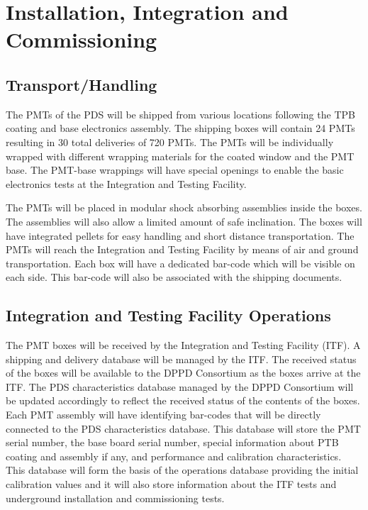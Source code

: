 \section{Installation, Integration and Commissioning}
\label{sec:fddp-pd-9}

\subsection{Transport/Handling}
\label{sec:fddp-pd-9.1}

The PMTs of the PDS will be shipped from various locations following the TPB coating and base electronics assembly. The shipping boxes will contain 24 PMTs resulting in 30 total deliveries of 720 PMTs. The PMTs will be individually wrapped with different wrapping materials for the coated window and the PMT base. The PMT-base wrappings will have special openings to enable the basic electronics tests at the Integration and Testing Facility.

The PMTs will be placed in modular shock absorbing assemblies inside the boxes. The assemblies will also allow a limited amount of safe inclination. The boxes will have integrated pellets for easy handling and short distance transportation. The PMTs will reach the Integration and Testing Facility by means of air and ground transportation. Each box will have a dedicated bar-code which will be visible on each side. This bar-code will also be associated with the shipping documents. 

\subsection{Integration and Testing Facility Operations}
\label{sec:fddp-pd-9.2}

The PMT boxes will be received by the Integration and Testing Facility (ITF). A shipping and delivery database will be managed by the ITF. The received status of the boxes will be available to the DPPD Consortium as the boxes arrive at the ITF. The PDS characteristics database managed by the DPPD Consortium will be updated accordingly to reflect the received status of the contents of the boxes. Each PMT assembly will have identifying bar-codes that will be directly connected to the PDS characteristics database. This database will store the PMT serial number, the base board serial number, special information about PTB coating and assembly if any, and performance and calibration characteristics. This database will form the basis of the operations database providing the initial calibration values and it will also store information about the ITF tests and underground installation and commissioning tests.

